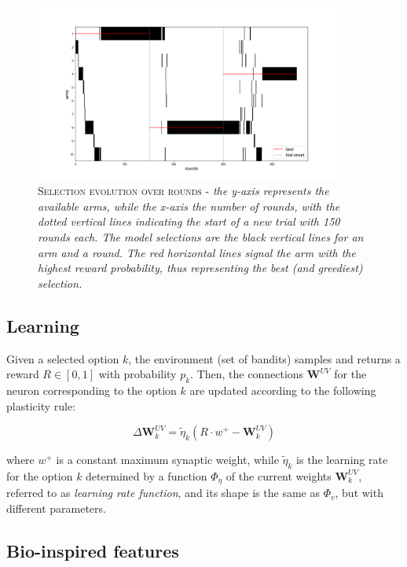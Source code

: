 \begin{figure}[ht]
    \centering
    \includegraphics[width=0.9\textwidth]{figures/selections_1.png}
    \caption{\textsc{Selection evolution over rounds} - \textit{the y-axis represents the available arms, while the x-axis the number of rounds, with the dotted vertical lines indicating the start of a new trial with 150 rounds each.
The model selections are the black vertical lines for an arm and a round. The red horizontal lines signal the arm with the highest reward probability, thus representing the best (and greediest) selection.}}
    \label{fig:sel1}
\end{figure}


\subsection{Learning}
Given a selected option $k$, the environment (set of bandits) samples and returns a reward $R\in [0, 1]$ with probability $p_{k}$.
Then, the connections $\textbf{W}^{UV}$ for the neuron corresponding to the option $k$ are updated according to the following plasticity rule:

\begin{equation}
    \Delta \textbf{W}^{UV}_{k} = \tilde{\eta}_{k} \left(R\cdot w^{+}- \textbf{W}^{UV}_{k}\right)
\end{equation}

\noindent where $w^{+}$ is a constant maximum synaptic weight, while $\tilde{\eta}_{k}$ is the learning rate for the option $k$ determined by a function $\Phi_{\eta}$ of the current weights $\textbf{W}^{UV}_{k}$, referred to as \textit{learning rate function}, and its shape is the same as $\Phi_{v}$, but with different parameters.


\subsection{Bio-inspired features}

